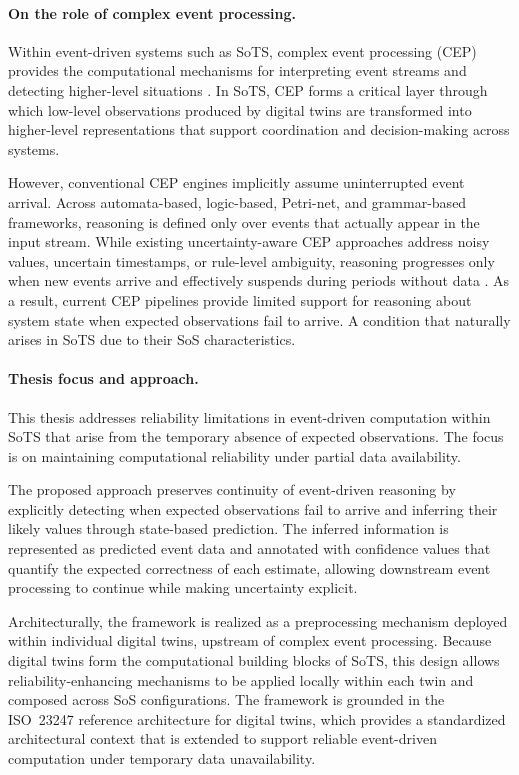 \paragraph{On the role of complex event processing.}
Within event-driven systems such as SoTS, complex event processing (CEP) provides the computational mechanisms for interpreting event streams and detecting higher-level situations \citep{luckham2002power}. In SoTS, CEP forms a critical layer through which low-level observations produced by digital twins are transformed into higher-level representations that support coordination and decision-making across systems.

However, conventional CEP engines implicitly assume uninterrupted event arrival. Across automata-based, logic-based, Petri-net, and grammar-based frameworks, reasoning is defined only over events that actually appear in the input stream. While existing uncertainty-aware CEP approaches address noisy values, uncertain timestamps, or rule-level ambiguity, reasoning progresses only when new events arrive and effectively suspends during periods without data \citep{alevizos2017probabilistic}. As a result, current CEP pipelines provide limited support for reasoning about system state when expected observations fail to arrive. A condition that naturally arises in SoTS due to their SoS characteristics.


\paragraph{Thesis focus and approach.}
This thesis addresses reliability limitations in event-driven computation within SoTS that arise from the temporary absence of expected observations. The focus is on maintaining computational reliability under partial data availability.

The proposed approach preserves continuity of event-driven reasoning by explicitly detecting when expected observations fail to arrive and inferring their likely values through state-based prediction. The inferred information is represented as predicted event data and annotated with confidence values that quantify the expected correctness of each estimate, allowing downstream event processing to continue while making uncertainty explicit.

Architecturally, the framework is realized as a preprocessing mechanism deployed within individual digital twins, upstream of complex event processing. Because digital twins form the computational building blocks of SoTS, this design allows reliability-enhancing mechanisms to be applied locally within each twin and composed across SoS configurations. The framework is grounded in the ISO~23247 reference architecture \cite{iso23247_2_2021} for digital twins, which provides a standardized architectural context that is extended to support reliable event-driven computation under temporary data unavailability.


